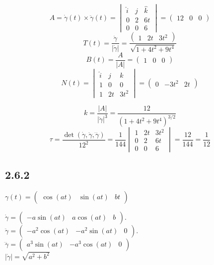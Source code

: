 \documentclass[10pt, a4paper]{article} %
\begin{document}
\[A = \dot\gamma(t) \times \ddot\gamma(t) = \begin{vmatrix}
    \hat i & \hat j & \hat k \\ 0 & 2 & 6t \\ 0 & 0 & 6
\end{vmatrix} = \begin{pmatrix}
    12 & 0 & 0
\end{pmatrix}\]
\[T(t) = \frac{\dot \gamma}{|\dot\gamma|} = \frac{\begin{pmatrix}1 & 2t & 3t^2\end{pmatrix}}{\sqrt{1+4t^2+9t^4}}\]
\[B(t) = \frac{A}{|A|} = \begin{pmatrix}
    1 & 0 & 0
\end{pmatrix}\]
\[N(t) = \begin{vmatrix}
    \hat i & \hat j & \hat k \\ 1 & 0 & 0 \\ 1 & 2t & 3t^2
\end{vmatrix} = \begin{pmatrix}
    0 & -3t^2 & 2t
\end{pmatrix}\]

\[k = \frac{|A|}{|\dot\gamma|^3} = \frac{12}{(1+4t^2+9t^4)^{3/2}}\]
\[\tau = \frac{\det(\dot\gamma, \ddot\gamma, \dddot\gamma)}{12^2} = \frac{1}{144}\begin{vmatrix}
    1 & 2t & 3t^2 \\ 0 & 2 & 6t \\ 0 & 0 & 6
\end{vmatrix} = \frac{12}{144} = \frac{1}{12}\]

\subsection*{2.6.2}
\begin{mdframed}
    $\gamma(t) = \begin{pmatrix}
        \cos(at) & \sin(at) & bt
    \end{pmatrix}$
\end{mdframed}

$\dot\gamma = \begin{pmatrix}-a\sin(at) & a\cos(at) & b\end{pmatrix}$.\\
$\ddot\gamma = \begin{pmatrix}-a^2\cos(at) & -a^2\sin(at) & 0\end{pmatrix}$.\\
$\dddot\gamma = \begin{pmatrix}a^3\sin(at) & -a^3\cos(at) & 0\end{pmatrix}$\\
$|\dot\gamma| = \sqrt{a^2+b^2}$
\end{document}
